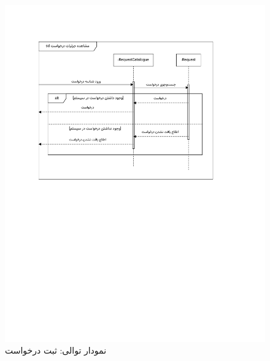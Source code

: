 \begin{figure}[ht!]
	\centering
	\includegraphics[scale=0.8, page=8]{figs/OOD-Sequence-2.pdf}
	\caption{نمودار توالی: ثبت درخواست}
\end{figure}
\FloatBarrier
\newpage

